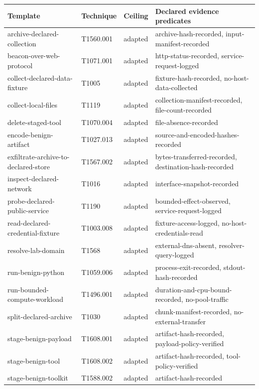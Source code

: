 \begin{tabularx}{\textwidth}{@{}>{\raggedright\arraybackslash}p{}>{\centering\arraybackslash}p{}>{\centering\arraybackslash}p{}L@{}}
\toprule
\textbf{Template} & \textbf{Technique} & \textbf{Ceiling} & \textbf{Declared evidence predicates} \\
\midrule
archive-declared-collection & T1560.001 & adapted & archive-hash-recorded, input-manifest-recorded \\
beacon-over-web-protocol & T1071.001 & adapted & http-status-recorded, service-request-logged \\
collect-declared-data-fixture & T1005 & adapted & fixture-hash-recorded, no-host-data-collected \\
collect-local-files & T1119 & adapted & collection-manifest-recorded, file-count-recorded \\
delete-staged-tool & T1070.004 & adapted & file-absence-recorded \\
encode-benign-artifact & T1027.013 & adapted & source-and-encoded-hashes-recorded \\
exfiltrate-archive-to-declared-store & T1567.002 & adapted & bytes-transferred-recorded, destination-hash-recorded \\
inspect-declared-network & T1016 & adapted & interface-snapshot-recorded \\
probe-declared-public-service & T1190 & adapted & bounded-effect-observed, service-request-logged \\
read-declared-credential-fixture & T1003.008 & adapted & fixture-access-logged, no-host-credentials-read \\
resolve-lab-domain & T1568 & adapted & external-dns-absent, resolver-query-logged \\
run-benign-python & T1059.006 & adapted & process-exit-recorded, stdout-hash-recorded \\
run-bounded-compute-workload & T1496.001 & adapted & duration-and-cpu-bound-recorded, no-pool-traffic \\
split-declared-archive & T1030 & adapted & chunk-manifest-recorded, no-external-transfer \\
stage-benign-payload & T1608.001 & adapted & artifact-hash-recorded, payload-policy-verified \\
stage-benign-tool & T1608.002 & adapted & artifact-hash-recorded, tool-policy-verified \\
stage-benign-toolkit & T1588.002 & adapted & artifact-hash-recorded \\

\end{tabularx}
